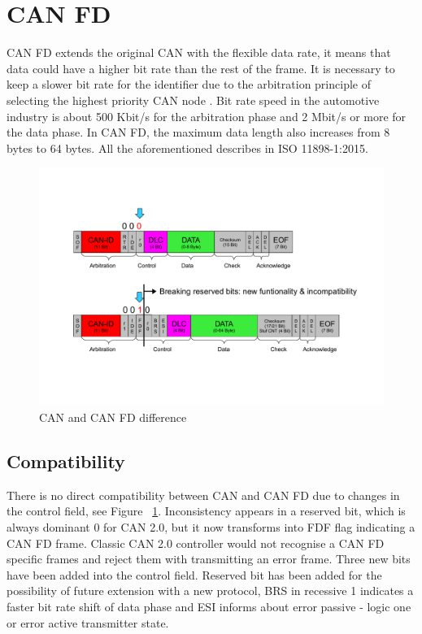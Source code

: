 \documentclass{ctuthesis}
\begin{document}
 \section{CAN FD}
  CAN FD extends the original CAN with the flexible data rate, it means that data could have a higher bit rate than the rest of the frame. It is necessary to keep a slower bit rate for the identifier due to the arbitration principle of selecting the highest priority CAN node \cite{priority_can}. Bit rate speed in the automotive industry is about 500 Kbit/s for the arbitration phase and 2 Mbit/s or more for the data phase. In CAN FD, the maximum data length also increases from 8 bytes to 64 bytes. All the aforementioned describes in ISO 11898-1:2015.
  \begin{figure}[H]
  \includegraphics[width=1\textwidth]{agl2017-socketcan-can_fd}
  \caption{CAN and CAN FD difference \cite{canfd}}
  \label{fig:cancanfddifference}
  \end{figure}
  \subsection{Compatibility}
  \label{section:combability}
   There is no direct compatibility between CAN and CAN FD due to changes in the control field, see Figure ~\ref{fig:cancanfddifference}. Inconsistency appears in a reserved bit, which is always dominant 0 for CAN 2.0, but it now transforms into FDF flag indicating a CAN FD frame. Classic CAN 2.0 controller would not recognise a CAN FD specific frames and reject them with transmitting an error frame. Three new bits have been added into the control field. Reserved bit has been added for the possibility of future extension with a new protocol, BRS in recessive 1 indicates a faster bit rate shift of data phase and ESI informs about error passive - logic one or error active transmitter state.
\end{document}
